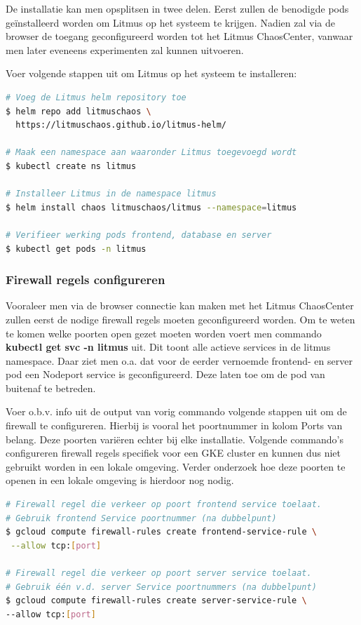 De installatie kan men opsplitsen in twee delen. Eerst zullen de benodigde pods geïnstalleerd worden om Litmus op het systeem te krijgen. Nadien zal via de browser de toegang geconfigureerd worden tot het Litmus ChaosCenter, vanwaar men later eveneens experimenten zal kunnen uitvoeren. 

Voer volgende stappen uit om Litmus op het systeem te installeren:
\begin{lstlisting}[language=bash]
# Voeg de Litmus helm repository toe 
$ helm repo add litmuschaos \
  https://litmuschaos.github.io/litmus-helm/

# Maak een namespace aan waaronder Litmus toegevoegd wordt
$ kubectl create ns litmus

# Installeer Litmus in de namespace litmus
$ helm install chaos litmuschaos/litmus --namespace=litmus

# Verifieer werking pods frontend, database en server 
$ kubectl get pods -n litmus
\end{lstlisting}

\subsubsection{Firewall regels configureren}

Vooraleer men via de browser connectie kan maken met het Litmus ChaosCenter zullen eerst de nodige firewall regels moeten geconfigureerd worden. Om te weten te komen welke poorten open gezet moeten worden voert men commando {\bf kubectl get svc -n litmus} uit. \newline Dit toont alle actieve services in de litmus namespace. Daar ziet men o.a. dat voor de eerder vernoemde frontend- en server pod een Nodeport service is geconfigureerd. Deze laten toe om de pod van buitenaf te betreden. 

Voer o.b.v. info uit de output van vorig commando volgende stappen uit om de firewall te configureren. Hierbij is vooral het poortnummer in kolom Ports van belang. Deze poorten variëren echter bij elke installatie. Volgende commando's configureren firewall regels specifiek voor een GKE cluster en kunnen dus niet gebruikt worden in een lokale omgeving. Verder onderzoek hoe deze poorten te openen in een lokale omgeving is hierdoor nog nodig.  
\begin{lstlisting}[language=bash]
# Firewall regel die verkeer op poort frontend service toelaat.
# Gebruik frontend Service poortnummer (na dubbelpunt) 
$ gcloud compute firewall-rules create frontend-service-rule \
 --allow tcp:[port]

# Firewall regel die verkeer op poort server service toelaat. 
# Gebruik één v.d. server Service poortnummers (na dubbelpunt) 
$ gcloud compute firewall-rules create server-service-rule \
--allow tcp:[port]

\end{lstlisting}

